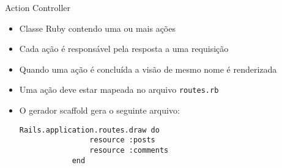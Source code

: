 \begin{frame}{Action Controller}
	\begin{itemize}
		\item Classe Ruby contendo uma ou mais ações
		\item Cada ação é responsável pela resposta a uma requisição
		\item Quando uma ação é concluída a visão de mesmo nome é renderizada
		\item Uma ação deve estar mapeada no arquivo \verb|routes.rb|
		\item O gerador scaffold gera o seguinte arquivo:
		\begin{lstlisting}[style=RubyInputStyle]
			Rails.application.routes.draw do 
				resource :posts
				resource :comments
			end 
		\end{lstlisting}			
	\end{itemize}	
\end{frame}